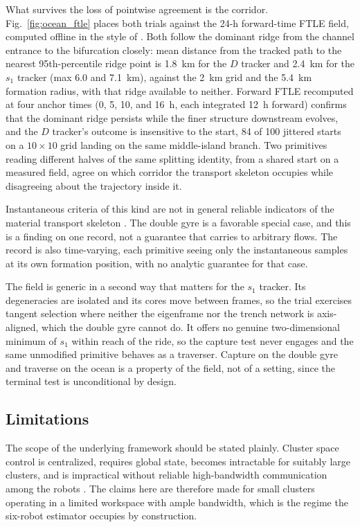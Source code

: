 \documentclass[lettersize,journal]{IEEEtran}
\begin{document}
What survives the loss of pointwise agreement is the corridor.
Fig.~\ref{fig:ocean_ftle} places both trials against the 24-h forward-time
FTLE field, computed offline in the style of
\cite{11}. Both follow the dominant ridge from the channel entrance to the
bifurcation closely: mean distance from the tracked path to the nearest
95th-percentile ridge point is 1.8~km for the $D$ tracker and 2.4~km for
the $s_1$ tracker (max 6.0 and 7.1~km), against the 2~km grid and the
5.4~km formation radius, with that ridge available to neither. Forward
FTLE recomputed at four anchor times (0, 5, 10, and 16~h, each
integrated 12~h forward) confirms that the dominant ridge
persists while the finer structure downstream evolves, and the $D$
tracker's outcome is insensitive to the start, 84 of 100
jittered starts on a $10 \times 10$ grid landing on the same
middle-island branch. Two primitives reading different halves of the
same splitting identity, from a shared start on a measured field, agree
on which corridor the transport skeleton occupies while disagreeing
about the trajectory inside it.

Instantaneous criteria of this kind are not in general reliable indicators
of the material transport skeleton \cite{16}. The double gyre is a
favorable special case, and this is a finding on one record, not a
guarantee that carries to arbitrary flows. The record is also
time-varying, each primitive seeing only the instantaneous samples at
its own formation position, with no analytic guarantee for that case.

The field is generic in a second way that matters for the $s_1$ tracker.
Its degeneracies are isolated and its cores move between frames, so the
trial exercises tangent selection where neither the eigenframe nor the
trench network is axis-aligned, which the double gyre cannot do. It
offers no genuine two-dimensional minimum of $s_1$ within reach of the
ride, so the capture test never engages and the same unmodified
primitive behaves as a traverser. Capture on the double gyre and
traverse on the ocean is a property of the field, not of a setting,
since the terminal test is unconditional by design.

\subsection{Limitations}
\label{sec:disc_limits}

The scope of the underlying framework should be stated plainly. Cluster
space control is centralized, requires global state, becomes intractable
for suitably large clusters, and is impractical without reliable
high-bandwidth communication among the robots \cite{31}. The claims here
are therefore made for small clusters operating in a limited workspace
with ample bandwidth, which is the regime the six-robot estimator
occupies by construction.
\end{document}
